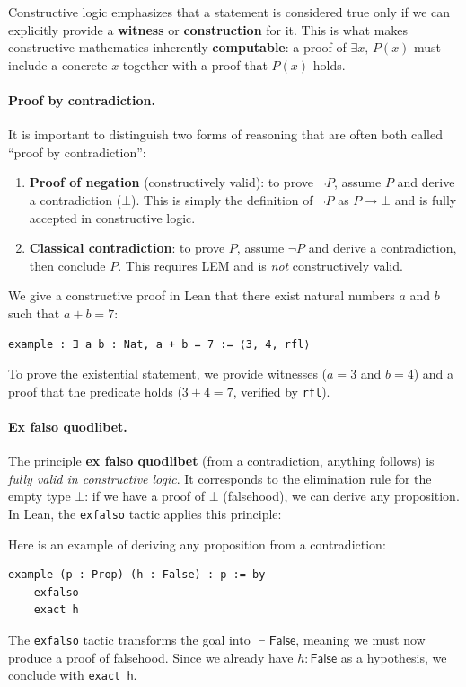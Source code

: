 Constructive logic emphasizes that a statement is considered true
only if we can explicitly provide a \textbf{witness} or
\textbf{construction} for it.
This is what makes constructive mathematics inherently
\textbf{computable}: a proof of $\exists x,\, P(x)$ must include a
concrete $x$ together with a proof that $P(x)$ holds.

\paragraph{Proof by contradiction.}
It is important to distinguish two forms of reasoning that are often
both called ``proof by contradiction'':
\begin{enumerate}
  \item \textbf{Proof of negation} (constructively valid): to prove
        $\lnot P$, assume $P$ and derive a contradiction ($\bot$).
        This is simply the definition of $\lnot P$ as $P \to \bot$ and
        is fully accepted in constructive logic.
  \item \textbf{Classical contradiction}: to prove $P$, assume
        $\lnot P$ and derive a contradiction, then conclude $P$.
        This requires LEM and is \emph{not} constructively valid.
\end{enumerate}

\begin{example}
  We give a constructive proof in Lean that there exist natural
  numbers $a$ and $b$ such that $a + b = 7$:
  \begin{lstlisting}[language=lean]
example : ∃ a b : Nat, a + b = 7 := ⟨3, 4, rfl⟩
  \end{lstlisting}
  To prove the existential statement, we provide witnesses
  ($a = 3$ and $b = 4$) and a proof that the predicate holds
  ($3 + 4 = 7$, verified by \lstinline[language=lean]|rfl|).
\end{example}

\paragraph{Ex falso quodlibet.}
The principle \textbf{ex falso quodlibet} (from a contradiction,
anything follows) is \emph{fully valid in constructive logic}.
It corresponds to the elimination rule for the empty type
$\bot$: if we have a proof of $\bot$ (falsehood), we can derive any
proposition.
In Lean, the \lstinline[language=lean]|exfalso| tactic applies this
principle:

\begin{example}
  Here is an example of deriving any proposition from a contradiction:
  \begin{lstlisting}[language=lean]
  example (p : Prop) (h : False) : p := by
    exfalso
    exact h
  \end{lstlisting}
  The \lstinline[language=lean]|exfalso| tactic transforms the goal
  into $\vdash \mathsf{False}$, meaning we must now produce a proof
  of falsehood.
  Since we already have $h : \mathsf{False}$ as a hypothesis, we
  conclude with \lstinline[language=lean]|exact h|.
\end{example}


